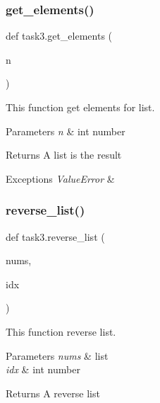 \subsubsection{\texorpdfstring{get\+\_\+elements()}{get\_elements()}}
{\footnotesize\ttfamily def task3.\+get\+\_\+elements (\begin{DoxyParamCaption}\item[{}]{n }\end{DoxyParamCaption})}



This function get elements for list. 


\begin{DoxyParams}{Parameters}
{\em n} & int number \\
\hline
\end{DoxyParams}
\begin{DoxyReturn}{Returns}
A list is the result
\end{DoxyReturn}

\begin{DoxyExceptions}{Exceptions}
{\em Value\+Error} & \\
\hline
\end{DoxyExceptions}
\mbox{\label{namespacetask3_abf4bcae5f5910c00fa06c3248366a8b4}} 
\subsubsection{\texorpdfstring{reverse\+\_\+list()}{reverse\_list()}}
{\footnotesize\ttfamily def task3.\+reverse\+\_\+list (\begin{DoxyParamCaption}\item[{}]{nums,  }\item[{}]{idx }\end{DoxyParamCaption})}



This function reverse list. 


\begin{DoxyParams}{Parameters}
{\em nums} & list \\
\hline
{\em idx} & int number \\
\hline
\end{DoxyParams}
\begin{DoxyReturn}{Returns}
A reverse list
\end{DoxyReturn}

